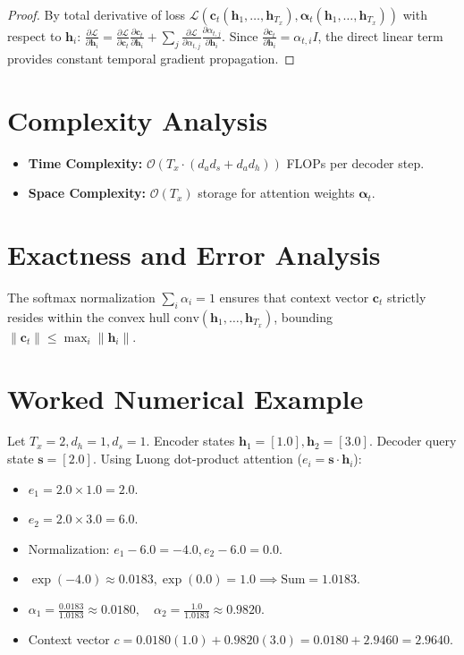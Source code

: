 \documentclass[11pt,a4paper]{article}
\theoremstyle{definition}
\begin{document}
\begin{proof}
By total derivative of loss $\mathcal{L}(\mathbf{c}_t(\mathbf{h}_1, \dots, \mathbf{h}_{T_x}), \boldsymbol{\alpha}_t(\mathbf{h}_1, \dots, \mathbf{h}_{T_x}))$ with respect to $\mathbf{h}_i$:
$\frac{\partial \mathcal{L}}{\partial \mathbf{h}_i} = \frac{\partial \mathcal{L}}{\partial \mathbf{c}_t} \frac{\partial \mathbf{c}_t}{\partial \mathbf{h}_i} + \sum_j \frac{\partial \mathcal{L}}{\partial \alpha_{t, j}} \frac{\partial \alpha_{t, j}}{\partial \mathbf{h}_i}$.
Since $\frac{\partial \mathbf{c}_t}{\partial \mathbf{h}_i} = \alpha_{t, i} I$, the direct linear term provides constant temporal gradient propagation.
\end{proof}

\section{Complexity Analysis}

\begin{itemize}
    \item \textbf{Time Complexity:} $\mathcal{O}(T_x \cdot (d_a d_s + d_a d_h))$ FLOPs per decoder step.
    \item \textbf{Space Complexity:} $\mathcal{O}(T_x)$ storage for attention weights $\boldsymbol{\alpha}_t$.
\end{itemize}

\section{Exactness and Error Analysis}

The softmax normalization $\sum_i \alpha_i = 1$ ensures that context vector $\mathbf{c}_t$ strictly resides within the convex hull $\text{conv}(\mathbf{h}_1, \dots, \mathbf{h}_{T_x})$, bounding $\|\mathbf{c}_t\| \le \max_i \|\mathbf{h}_i\|$.

\section{Worked Numerical Example}

Let $T_x = 2, d_h = 1, d_s = 1$. Encoder states $\mathbf{h}_1 = [1.0], \mathbf{h}_2 = [3.0]$.
Decoder query state $\mathbf{s} = [2.0]$.
Using Luong dot-product attention ($e_i = \mathbf{s} \cdot \mathbf{h}_i$):
\begin{itemize}
    \item $e_1 = 2.0 \times 1.0 = 2.0$.
    \item $e_2 = 2.0 \times 3.0 = 6.0$.
    \item Normalization: $e_1 - 6.0 = -4.0, e_2 - 6.0 = 0.0$.
    \item $\exp(-4.0) \approx 0.0183, \exp(0.0) = 1.0 \implies \text{Sum} = 1.0183$.
    \item $\alpha_1 = \frac{0.0183}{1.0183} \approx 0.0180, \quad \alpha_2 = \frac{1.0}{1.0183} \approx 0.9820$.
    \item Context vector $c = 0.0180(1.0) + 0.9820(3.0) = 0.0180 + 2.9460 = 2.9640$.
\end{itemize}
\end{document}
